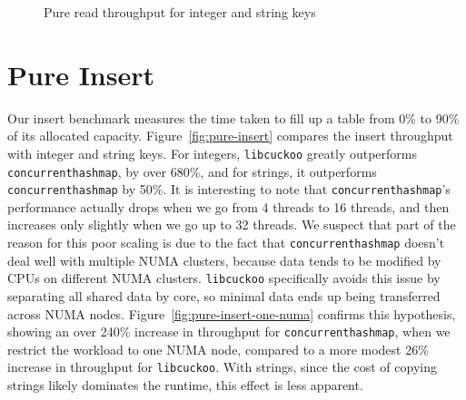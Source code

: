 \documentclass{article}
\newcommand{\tbbmap}{\texttt{concurrent\textunderscore hash\textunderscore map}}
\newcommand{\libcuckoo}{\texttt{libcuckoo}}
\begin{document}
\begin{figure}[!htbp]
  \centering
  \caption{Pure read throughput for integer and string keys}
  \label{fig:pure-read}
\end{figure}

\section*{Pure Insert}
Our insert benchmark measures the time taken to fill up a table from 0\% to 90\%
of its allocated capacity. Figure~\ref{fig:pure-insert} compares the insert
throughput with integer and string keys. For integers, {\libcuckoo} greatly
outperforms {\tbbmap}, by over 680\%, and for strings, it outperforms {\tbbmap}
by 50\%. It is interesting to note that {\tbbmap}'s performance actually drops
when we go from 4 threads to 16 threads, and then increases only slightly when
we go up to 32 threads. We suspect that part of the reason for this poor scaling
is due to the fact that {\tbbmap} doesn't deal well with multiple NUMA clusters,
because data tends to be modified by CPUs on different NUMA clusters.
{\libcuckoo} specifically avoids this issue by separating all shared data by
core, so minimal data ends up being transferred across NUMA nodes.
Figure~\ref{fig:pure-insert-one-numa} confirms this hypothesis, showing an over
240\% increase in throughput for {\tbbmap}, when we restrict the workload to one
NUMA node, compared to a more modest 26\% increase in throughput for
{\libcuckoo}. With strings, since the cost of copying strings likely dominates
the runtime, this effect is less apparent.
\end{document}
